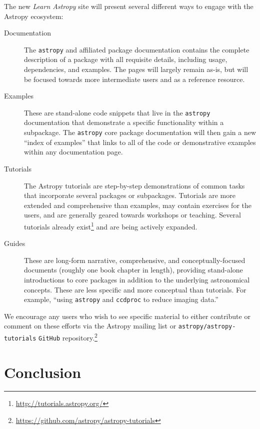 \documentclass[modern]{aastex62}
\newcommand{\package}[1]{\texttt{#1}\xspace}
\newcommand{\github}{\package{GitHub}}
\newcommand{\astropy}{Astropy\xspace}
\newcommand{\astropypkg}{\package{astropy}}
\begin{document}
The new \emph{Learn Astropy} site will present several different ways to engage
with the \astropy ecosystem:
\begin{description}
    \item[Documentation] The \astropypkg and affiliated package documentation
        contains the complete description of a package with all requisite
        details, including usage, dependencies, and examples.
        The pages will largely remain as-is, but will be focused towards more
        intermediate users and as a reference resource.
    \item[Examples] These are stand-alone code snippets that live in the
        \astropypkg documentation that demonstrate a specific functionality
        within a subpackage.
        The \astropypkg core package documentation will then gain a new ``index
        of examples'' that links to all of the code or demonstrative examples
        within any documentation page.
    \item[Tutorials] The \astropy tutorials are step-by-step demonstrations of
        common tasks that incorporate several packages or subpackages.
        Tutorials are more extended and comprehensive than examples, may contain
        exercises for the users, and are generally geared towards workshops or
        teaching.
        Several tutorials already
        exist\footnote{\url{http://tutorials.astropy.org/}} and are being
        actively expanded.
    \item[Guides] These are long-form narrative, comprehensive, and
        conceptually-focused documents (roughly one book chapter in length),
        providing stand-alone introductions to core packages in addition to the
        underlying astronomical concepts.
        These are less specific and more conceptual than tutorials.
        For example, ``using \astropypkg and \package{ccdproc} to reduce imaging
        data.''
\end{description}
We encourage any users who wish to see specific material to either contribute or
comment on these efforts via the \astropy mailing list or \package{astropy/astropy-tutorials}
\github repository.\footnote{\url{https://github.com/astropy/astropy-tutorials}}

\section{Conclusion}
\label{sec:conclusion}
\end{document}
